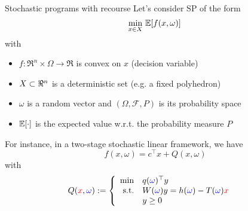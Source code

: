 \begin{frame}{Stochastic programs with recourse}
Let's consider SP of the form
\[
\min_{x \in X}\, \mathbb{E}[f(x,\omega)]\,
\]
\pula
with
\begin{itemize}
\item $f:\Re^n\times \Omega \to \Re$ is convex on $x$ (decision variable)
\item $X \subset \Re^n$ is a deterministic set (e.g. a fixed polyhedron)
\item $\omega$ is a random vector and $(\Omega,\mathcal{F},P)$ is its probability space
\item $\mathbb{E}[\cdot]$ is the expected value w.r.t. the probability measure $P$
\end{itemize}
\pula
For instance, in a two-stage stochastic linear framework, we have
\[
f(x,\omega) = c^\top x + Q(x,\omega)
\]
with
\[Q({\color{red}x},{\color{blue}\omega}):=\left\{ \begin{array}{rll}
\min & q({\color{blue}\omega})^\top y &\\
\mbox{s.t.} & W({\color{blue}\omega}) y   =h({\color{blue}\omega})-T({\color{blue}\omega}){\color{red}x}&\\
& y  \geq 0  &
\end{array} \right.\]
\end{frame}


%
%
%


